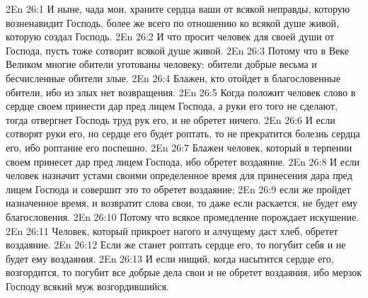 \vs 2En 26:1
И ныне, чада мои, храните сердца ваши от всякой неправды, которую возненавидит Господь, более же всего по отношению ко всякой душе живой, которую создал Господь.
\vs 2En 26:2
И что просит человек для своей души от Господа, пусть тоже сотворит всякой душе живой.
\vs 2En 26:3
Потому что в Веке Великом многие обители уготованы человеку: обители добрые весьма и бесчисленные обители злые.
\vs 2En 26:4
Блажен, кто отойдет в благословенные обители, ибо из злых нет возвращения.
\vs 2En 26:5
Когда положит человек слово в сердце своем принести дар пред лицем Господа, а руки его того не сделают, тогда отвергнет Господь труд рук его, и не обретет ничего.
\vs 2En 26:6
И если сотворят руки его, но сердце его будет роптать, то не прекратится болезнь сердца его, ибо роптание его поспешно.
\vs 2En 26:7
Блажен человек, который в терпении своем принесет дар пред лицем Господа, ибо обретет воздаяние.
\vs 2En 26:8
И если человек назначит устами своими определенное время для принесения дара пред лицем Господа и совершит это то обретет воздаяние;
\vs 2En 26:9
если же пройдет назначенное время, и возвратит слова свои, то даже если раскается, не будет ему благословения.
\vs 2En 26:10
Потому что всякое промедление порождает искушение.
\vs 2En 26:11
Человек, который прикроет нагого и алчущему даст хлеб, обретет воздаяние.
\vs 2En 26:12
Если же станет роптать сердце его, то погубит себя и не будет ему воздаяния.
\vs 2En 26:13
И если нищий, когда насытится сердце его, возгордится, то погубит все добрые дела свои и не обретет воздаяния, ибо мерзок Господу всякий муж возгордившийся.

